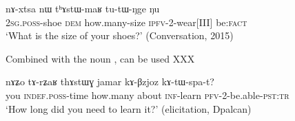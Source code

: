  \begin{exe}
\ex \label{ex:thAstWmaR}
 \gll   nɤ-xtsa nɯ tʰɤstɯ-maʁ tu-tɯ-ŋge ŋu   \\
\textsc{2sg.poss}-shoe \textsc{dem} how.many-size \textsc{ipfv}-2-wear[III] be:\textsc{fact} \\ 
\glt `What is the size of your shoes?'  (Conversation, 2015)
\end{exe} 

%

Combined with the noun , 	 can be used  XXX

\begin{exe}
\ex
 \gll   nɤʑo 	tɤ-rʑaʁ 	thɤstɯɣ 	jamar 	kɤ-βzjoz 	kɤ-tɯ-spa-t?  \\
 you \textsc{indef.poss}-time how.many about \textsc{inf}-learn \textsc{pfv}-2-be.able-\textsc{pst:tr} \\
\glt   `How long did you need to learn it?' (elicitation, Dpalcan)
\end{exe} 
 
